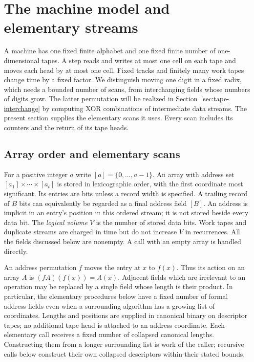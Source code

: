\documentclass[11pt]{article}
\theoremstyle{definition}
\begin{document}
  \section{The machine model and elementary streams}
\label{sec:streams}

A machine has one fixed finite alphabet and one fixed finite number of
one-dimensional tapes. A step reads and writes at most one cell on each
tape and moves each head by at most one cell. Fixed tracks and finitely
many work tapes change time by a fixed factor. We distinguish moving one
digit in a fixed radix, which needs a bounded number of scans, from
interchanging fields whose numbers of digits grow. The latter permutation
will be realized in Section~\ref{sec:tape-interchange} by computing XOR
combinations of intermediate data streams. The present section supplies
the elementary scans it uses. Every scan includes its counters and the
return of its tape heads.

\subsection{Array order and elementary scans}

For a positive integer $a$ write $[a]=\{0,\ldots,a-1\}$.
An array with address set $[a_1]\times\cdots\times[a_t]$ is stored in
lexicographic order, with the first coordinate most significant.  Its
entries are bits unless a record width is specified.  A trailing record
of $B$ bits can equivalently be regarded as a final address field $[B]$.
An address is implicit in an entry's position in this ordered stream; it
is not stored beside every data bit.
The \emph{logical volume} $V$ is the number of stored data bits.  Work
tapes and duplicate streams are charged in time but do not increase $V$
in recurrences.  All the fields discussed below are nonempty.  A call
with an empty array is handled directly.

An address permutation $f$ moves the entry at $x$ to $f(x)$.  Thus its
action on an array $A$ is $(fA)(f(x))=A(x)$.  Adjacent fields which are
irrelevant to an operation may be replaced by a single field whose length
is their product.  In particular, the elementary procedures below have a
fixed number of formal address fields even when a surrounding algorithm
has a growing list of coordinates.  Lengths and positions are supplied in
canonical binary on descriptor tapes; no additional tape head is attached to an
address coordinate. Each elementary call receives a fixed number of
collapsed canonical lengths. Constructing them from a longer surrounding
list is work of the caller; recursive calls below construct their own
collapsed descriptors within their stated bounds.
\end{document}
